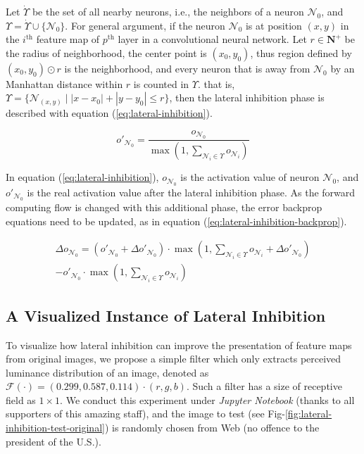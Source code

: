 \documentclass[conference]{IEEEtran}
\begin{document}
Let $\dot{\Upsilon}$ be the set of all nearby neurons, i.e., the neighbors of a
neuron $\mathcal{N}_0$, and $\Upsilon = \dot{\Upsilon} \cup \{\mathcal{N}_0\}$.
For general argument, if the neuron $\mathcal{N}_0$ is at position $(x,y)$
in the $i^{\text{th}}$ feature map of $p^{\text{th}}$ layer in a convolutional
neural network. Let $r\in\mathbf{N}^{+}$ be the radius of neighborhood, the center
point is $(x_0,y_0)$, thus region defined by $(x_0,y_0)\odot{r}$ is the neighborhood, and every neuron
that is away from $\mathcal{N}_0$ by an Manhattan distance within $r$ is counted in $\Upsilon$.
that is, $\Upsilon=\{\mathcal{N}_{(x,y)}\mid|x-x_0|+|y-y_0|\le r\}$, then the
lateral inhibition phase is described with equation (\ref{eq:lateral-inhibition}).

\begin{equation}
    o'_{\mathcal{N}_0}=\frac{o_{\mathcal{N}_0}}{\max(1, \sum_{\mathcal{N}_i\in\Upsilon}o_{\mathcal{N}_i})}
    \label{eq:lateral-inhibition}
\end{equation}

In equation (\ref{eq:lateral-inhibition}), $o_{\mathcal{N}_0}$ is the activation
value of neuron $\mathcal{N}_0$, and $o'_{\mathcal{N}_0}$ is the real activation
value after the lateral inhibition phase.
As the forward computing flow is changed with this additional phase, the error
backprop equations need to be updated, as in equation (\ref{eq:lateral-inhibition-backprop}).

\begin{multline}
    \Delta{o_{\mathcal{N}_0}} = ({o'}_{\mathcal{N}_0}+\Delta{o'}_{\mathcal{N}_0})\cdot
        \max(1, \sum_{\mathcal{N}_i\in\Upsilon}o_{\mathcal{N}_i} + \Delta{o'}_{\mathcal{N}_0})\\
    -{o'}_{\mathcal{N}_0}\cdot\max(1,\sum_{\mathcal{N}_i\in\Upsilon}o_{\mathcal{N}_i})
    \label{eq:lateral-inhibition-backprop}
\end{multline}

\subsection{A Visualized Instance of Lateral Inhibition}
To visualize how lateral inhibition can improve the presentation of feature maps
from original images, we propose a simple filter which only extracts perceived
luminance distribution of an image, denoted as $\mathcal{F}(\cdot)=(0.299,0.587,0.114)\cdot(r,g,b)$.
Such a filter has a size of receptive field as $1\times1$. We conduct this experiment
under \emph{Jupyter Notebook} (thanks to all supporters of this amazing staff), and
the image to test (see Fig-\ref{fig:lateral-inhibition-test-original})
is randomly chosen from Web (no offence to the president of the U.S.).
\end{document}

